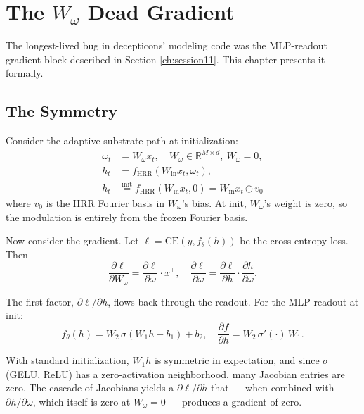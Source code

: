 \documentclass[11pt,openany]{book}
\theoremstyle{definition}
\theoremstyle{plain}
\newcommand{\omegaproj}{W_\omega}
\begin{document}
\chapter{The $\omegaproj$ Dead Gradient}
\label{ch:forensics-omega}

The longest-lived bug in decepticons' modeling code was the MLP-readout
gradient block described in Section \ref{ch:session11}. This chapter
presents it formally.

\section{The Symmetry}

Consider the adaptive substrate path at initialization:
\begin{align}
  \omega_t &= \omegaproj x_t,\quad \omegaproj \in \mathbb{R}^{M \times d},\ \omegaproj = 0, \\
  h_t &= f_{\text{HRR}}(W_{\text{in}} x_t, \omega_t), \\
  h_t &\stackrel{\text{init}}{=} f_{\text{HRR}}(W_{\text{in}} x_t, 0) = W_{\text{in}} x_t \odot v_0
\end{align}
where $v_0$ is the HRR Fourier basis in $\omegaproj$'s bias. At init,
$\omegaproj$'s weight is zero, so the modulation is entirely from the
frozen Fourier basis.

Now consider the gradient. Let $\ell = \mathrm{CE}(y, f_\theta(h))$ be
the cross-entropy loss. Then
\begin{equation}
  \frac{\partial \ell}{\partial \omegaproj} = \frac{\partial \ell}{\partial \omega}\cdot x^\top,
  \quad
  \frac{\partial \ell}{\partial \omega} = \frac{\partial \ell}{\partial h}\cdot\frac{\partial h}{\partial \omega}.
\end{equation}

The first factor, $\partial \ell / \partial h$, flows back through the
readout. For the MLP readout at init:
\begin{equation}
  f_\theta(h) = W_2\,\sigma(W_1 h + b_1) + b_2,
  \quad \frac{\partial f}{\partial h} = W_2\,\sigma'(\cdot)\,W_1.
\end{equation}

With standard initialization, $W_1 h$ is symmetric in expectation, and
since $\sigma$ (GELU, ReLU) has a zero-activation neighborhood, many
Jacobian entries are zero. The cascade of Jacobians yields a
$\partial \ell / \partial h$ that --- when combined with
$\partial h / \partial \omega$, which itself is zero at $\omegaproj = 0$
--- produces a gradient of zero.
\end{document}
